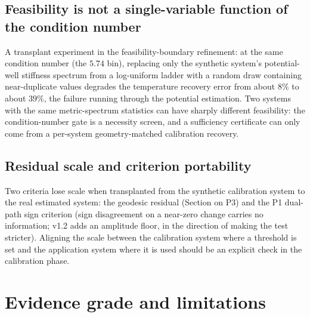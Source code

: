 \documentclass{article}
\begin{document}
\subsection{Feasibility is not a single-variable function of the condition
number}

A transplant experiment in the feasibility-boundary refinement: at the same
condition number (the $5.74$ bin), replacing only the synthetic system's
potential-well stiffness spectrum from a log-uniform ladder with a random draw
containing near-duplicate values degrades the temperature recovery error from
about $8\%$ to about $39\%$, the failure running through the potential
estimation. Two systems with the same metric-spectrum statistics can have
sharply different feasibility: the condition-number gate is a necessity screen,
and a sufficiency certificate can only come from a per-system geometry-matched
calibration recovery.

\subsection{Residual scale and criterion portability}
\label{sec:scale}

Two criteria lose scale when transplanted from the synthetic calibration system
to the real estimated system: the geodesic residual (Section on P3) and the P1
dual-path sign criterion (sign disagreement on a near-zero change carries no
information; v1.2 adds an amplitude floor, in the direction of making the test
stricter). Aligning the scale between the calibration system where a threshold is
set and the application system where it is used should be an explicit check in
the calibration phase.

\section{Evidence grade and limitations}
\end{document}
